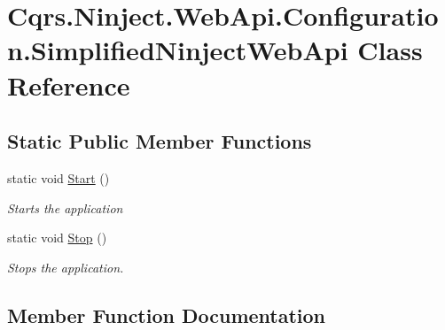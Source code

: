 \hypertarget{classCqrs_1_1Ninject_1_1WebApi_1_1Configuration_1_1SimplifiedNinjectWebApi}{}\section{Cqrs.\+Ninject.\+Web\+Api.\+Configuration.\+Simplified\+Ninject\+Web\+Api Class Reference}
\label{classCqrs_1_1Ninject_1_1WebApi_1_1Configuration_1_1SimplifiedNinjectWebApi}
\subsection*{Static Public Member Functions}
\begin{DoxyCompactItemize}
\item 
static void \hyperlink{classCqrs_1_1Ninject_1_1WebApi_1_1Configuration_1_1SimplifiedNinjectWebApi_a7da23980ac13618949a389c0beac6e89_a7da23980ac13618949a389c0beac6e89}{Start} ()
\begin{DoxyCompactList}\small\item\em Starts the application \end{DoxyCompactList}\item 
static void \hyperlink{classCqrs_1_1Ninject_1_1WebApi_1_1Configuration_1_1SimplifiedNinjectWebApi_a28327d1df27e02f828b52bb44319816d_a28327d1df27e02f828b52bb44319816d}{Stop} ()
\begin{DoxyCompactList}\small\item\em Stops the application. \end{DoxyCompactList}\end{DoxyCompactItemize}


\subsection{Member Function Documentation}
\mbox{\label{classCqrs_1_1Ninject_1_1WebApi_1_1Configuration_1_1SimplifiedNinjectWebApi_a7da23980ac13618949a389c0beac6e89_a7da23980ac13618949a389c0beac6e89}} 
